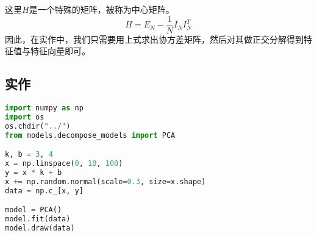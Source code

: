 \documentclass{report}
\begin{document}
这里$H$是一个特殊的矩阵，被称为中心矩阵。
$$
H=E_N - \frac{1}{N}I_N I_N^T
$$
因此，在实作中，我们只需要用上式求出协方差矩阵，然后对其做正交分解得到特征值与特征向量即可。
\subsection{实作}
\begin{lstlisting}[language={python}]
import numpy as np
import os
os.chdir("../")
from models.decompose_models import PCA

k, b = 3, 4
x = np.linspace(0, 10, 100)
y = x * k + b
x += np.random.normal(scale=0.3, size=x.shape)
data = np.c_[x, y]

model = PCA()
model.fit(data)
model.draw(data)
\end{lstlisting}
\end{document}
